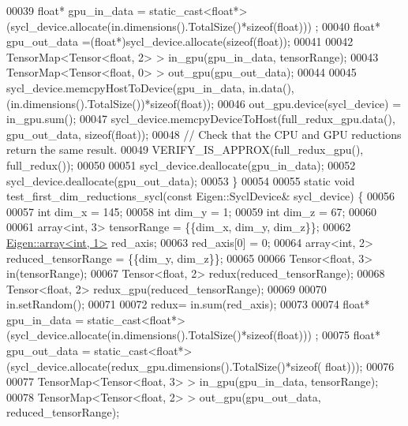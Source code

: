 \begin{DoxyCode}
00039   \textcolor{keywordtype}{float}* gpu\_in\_data = \textcolor{keyword}{static\_cast<}\textcolor{keywordtype}{float}*\textcolor{keyword}{>}(sycl\_device.allocate(in.dimensions().TotalSize()*\textcolor{keyword}{sizeof}(float)))
      ;
00040   \textcolor{keywordtype}{float}* gpu\_out\_data =(\textcolor{keywordtype}{float}*)sycl\_device.allocate(\textcolor{keyword}{sizeof}(\textcolor{keywordtype}{float}));
00041 
00042   TensorMap<Tensor<float, 2> >  in\_gpu(gpu\_in\_data, tensorRange);
00043   TensorMap<Tensor<float, 0> >  out\_gpu(gpu\_out\_data);
00044 
00045   sycl\_device.memcpyHostToDevice(gpu\_in\_data, in.data(),(in.dimensions().TotalSize())*\textcolor{keyword}{sizeof}(\textcolor{keywordtype}{float}));
00046   out\_gpu.device(sycl\_device) = in\_gpu.sum();
00047   sycl\_device.memcpyDeviceToHost(full\_redux\_gpu.data(), gpu\_out\_data, \textcolor{keyword}{sizeof}(float));
00048   \textcolor{comment}{// Check that the CPU and GPU reductions return the same result.}
00049   VERIFY\_IS\_APPROX(full\_redux\_gpu(), full\_redux());
00050 
00051   sycl\_device.deallocate(gpu\_in\_data);
00052   sycl\_device.deallocate(gpu\_out\_data);
00053 \}
00054 
00055 \textcolor{keyword}{static} \textcolor{keywordtype}{void} test\_first\_dim\_reductions\_sycl(\textcolor{keyword}{const} Eigen::SyclDevice& sycl\_device) \{
00056 
00057   \textcolor{keywordtype}{int} dim\_x = 145;
00058   \textcolor{keywordtype}{int} dim\_y = 1;
00059   \textcolor{keywordtype}{int} dim\_z = 67;
00060 
00061   array<int, 3> tensorRange = \{\{dim\_x, dim\_y, dim\_z\}\};
00062   \hyperlink{class_eigen_1_1array}{Eigen::array<int, 1>} red\_axis;
00063   red\_axis[0] = 0;
00064   array<int, 2> reduced\_tensorRange = \{\{dim\_y, dim\_z\}\};
00065 
00066   Tensor<float, 3> in(tensorRange);
00067   Tensor<float, 2> redux(reduced\_tensorRange);
00068   Tensor<float, 2> redux\_gpu(reduced\_tensorRange);
00069 
00070   in.setRandom();
00071 
00072   redux= in.sum(red\_axis);
00073 
00074   \textcolor{keywordtype}{float}* gpu\_in\_data = \textcolor{keyword}{static\_cast<}\textcolor{keywordtype}{float}*\textcolor{keyword}{>}(sycl\_device.allocate(in.dimensions().TotalSize()*\textcolor{keyword}{sizeof}(float)))
      ;
00075   \textcolor{keywordtype}{float}* gpu\_out\_data = \textcolor{keyword}{static\_cast<}\textcolor{keywordtype}{float}*\textcolor{keyword}{>}(sycl\_device.allocate(redux\_gpu.dimensions().TotalSize()*\textcolor{keyword}{sizeof}(
      float)));
00076 
00077   TensorMap<Tensor<float, 3> >  in\_gpu(gpu\_in\_data, tensorRange);
00078   TensorMap<Tensor<float, 2> >  out\_gpu(gpu\_out\_data, reduced\_tensorRange);

\end{DoxyCode}
